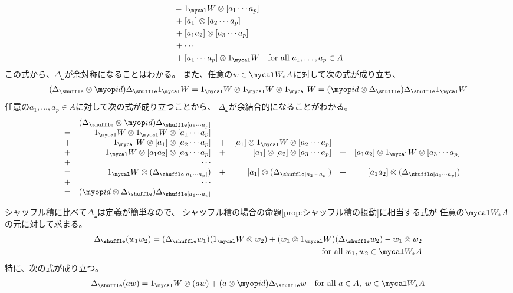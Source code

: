 {\begin{equation*}
\begin{split}
		&= 1_\W\otimes[a_1\cdots a_p] \\
		&\,+ [a_1]\otimes[a_2\cdots a_p] \\
		&\,+ [a_1a_2]\otimes[a_3\cdots a_p] \\
		&\,+ \cdots \\
		&\,+ [a_1\cdots a_p]\otimes1_\W 
		\quad\text{for all } a_1,\dots,a_p\in A
	\end{split}\end{equation*}
	この式から、$\Delta_\shuffle$が余対称になることはわかる。
	また、任意の$w\in\W_*A$に対して次の式が成り立ち、
	\begin{equation*}\begin{split}
		(\Delta_\shuffle\otimes\id)\Delta_\shuffle1_\W
		= 1_\W\otimes1_\W\otimes1_\W
		= (\id\otimes\Delta_\shuffle)\Delta_\shuffle1_\W
	\end{split}\end{equation*}
	任意の$a_1,\dots,a_p\in A$に対して次の式が成り立つことから、
	$\Delta_\shuffle$が余結合的になることがわかる。
	\begin{equation*}\begin{array}{lcrcrcr}
		&& (\Delta_\shuffle\otimes\id)\Delta_\shuffle[a_1\cdots a_p] \\
		&=& 1_\W\otimes1_\W\otimes[a_1\cdots a_p] \\
		&+& 1_\W\otimes[a_1]\otimes[a_2\cdots a_p]
		&+& [a_1]\otimes1_\W\otimes[a_2\cdots a_p] \\
		&+& 1_\W\otimes[a_1a_2]\otimes[a_3\cdots a_p]
		&+& [a_1]\otimes[a_2]\otimes[a_3\cdots a_p]
		&+& [a_1a_2]\otimes1_\W\otimes[a_3\cdots a_p] \\
		&+& \cdots \\
		&=& 1_\W\otimes(\Delta_\shuffle[a_1\cdots a_p])
		&+& [a_1]\otimes(\Delta_\shuffle[a_2\cdots a_p])
		&+& [a_1a_2]\otimes(\Delta_\shuffle[a_3\cdots a_p]) \\
		&+& \cdots \\
		&=& (\id\otimes\Delta_\shuffle)\Delta_\shuffle[a_1\cdots a_p]
	\end{array}\end{equation*}

	シャッフル積に比べて$\Delta_\shuffle$は定義が簡単なので、
	シャッフル積の場合の命題\ref{prop:シャッフル積の摂動}に相当する式が
	任意の$\W_*A$の元に対して求まる。
	\begin{equation*}\begin{split}
		\Delta_\shuffle(w_1w_2) = (\Delta_\shuffle w_1)(1_\W\otimes w_2)
		+ (w_1\otimes1_\W)(\Delta_\shuffle w_2) - w_1\otimes w_2 \\
		\quad\text{for all } w_1,w_2\in \W_*A
	\end{split}\end{equation*}
	特に、次の式が成り立つ。
	\begin{equation*}\begin{split}
		\Delta_\shuffle(aw) = 1_\W\otimes(aw) + (a\otimes\id)\Delta_\shuffle w
		\quad\text{for all } a\in A,\; w\in \W_*A
	\end{split}\end{equation*}

}
